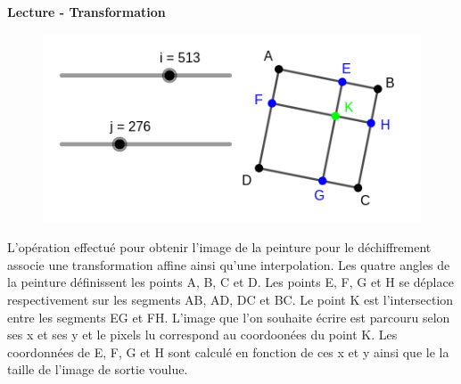 \documentclass{beamer}
\begin{document}
\begin{frame}[t]
\begin{columns}[t]
\begin{column}{.49\linewidth}

                \begin{block}{\centering \textbf{Lecture - Transformation}}
                    \vspace{0.5cm}

                    \begin{figure}
                        \includegraphics[width=\linewidth]{rsc/formule_transformation.png}
                    \end{figure}
                    L'opération effectué pour obtenir l'image de la peinture pour le déchiffrement associe une transformation affine ainsi qu'une interpolation.
                    Les quatre angles de la peinture définissent les points A, B, C et D. Les points E, F, G et H se déplace respectivement sur les segments AB, AD, DC et BC. Le point K est l'intersection entre les segments EG et FH.
                    L'image que l'on souhaite écrire est parcouru selon ses x et ses y et le pixels lu correspond au coordoonées du point K. Les coordonnées de E, F, G et H sont calculé en fonction de ces x et y ainsi que le la taille de l'image de sortie voulue.

                    \vspace{0.5cm}
                \end{block}



\end{column}
\end{columns}
\end{frame}
\end{document}
